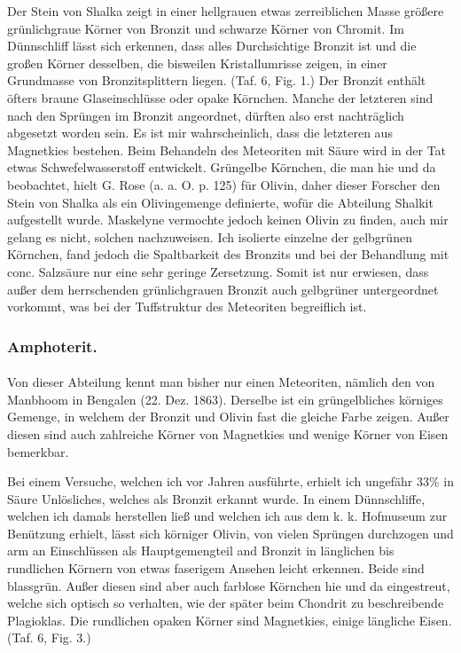 \documentclass[a4paper, 11pt, oneside, polutonikogreek, german]{article}
\begin{document}
Der Stein von Shalka zeigt in einer hellgrauen etwas zerreiblichen Masse größere grünlichgraue Körner von Bronzit und schwarze Körner von Chromit. Im Dünnschliff lässt sich erkennen, dass alles Durchsichtige Bronzit ist und die großen Körner desselben, die bisweilen Kristallumrisse zeigen, in einer Grundmasse von Bronzitsplittern liegen. (Taf. 6, Fig. 1.) Der Bronzit enthält öfters braune Glaseinschlüsse oder opake Körnchen. Manche der letzteren sind nach den Sprüngen im Bronzit angeordnet, dürften also erst nachträglich abgesetzt worden sein. Es ist mir wahrscheinlich, dass die letzteren aus Magnetkies bestehen. Beim Behandeln des Meteoriten mit Säure wird in der Tat etwas Schwefelwasserstoff entwickelt. Grüngelbe Körnchen, die man hie und da beobachtet, hielt G. Rose (a. a. O. p. 125) für Olivin, daher dieser Forscher den Stein von Shalka als ein Olivingemenge definierte, wofür die Abteilung Shalkit aufgestellt wurde. Maskelyne vermochte jedoch keinen Olivin zu finden, auch mir gelang es nicht, solchen nachzuweisen. Ich isolierte einzelne der gelbgrünen Körnchen, fand jedoch die Spaltbarkeit des Bronzits und bei der Behandlung mit conc. Salzsäure nur eine sehr geringe Zersetzung. Somit ist nur erwiesen, dass außer dem herrschenden grünlichgrauen Bronzit auch gelbgrüner untergeordnet vorkommt, was bei der Tuffstruktur des Meteoriten begreiflich ist.

\subsubsection{Amphoterit.}
\paragraph{}
Von dieser Abteilung kennt man bisher nur einen Meteoriten, nämlich den von Manbhoom in Bengalen (22. Dez. 1863). Derselbe ist ein grüngelbliches körniges Gemenge, in welchem der Bronzit und Olivin fast die gleiche Farbe zeigen. Außer diesen sind auch zahlreiche Körner von Magnetkies und wenige Körner von Eisen bemerkbar.

Bei einem Versuche, welchen ich vor Jahren ausführte, erhielt ich ungefähr 33\% in Säure Unlösliches, welches als Bronzit erkannt wurde. In einem Dünnschliffe, welchen ich damals herstellen ließ und welchen ich aus dem k. k. Hofmuseum zur Benützung erhielt, lässt sich körniger Olivin, von vielen Sprüngen durchzogen und arm an Einschlüssen als Hauptgemengteil and Bronzit in länglichen bis rundlichen Körnern von etwas faserigem Ansehen leicht erkennen. Beide sind blassgrün. Außer diesen sind aber auch farblose Körnchen hie und da eingestreut, welche sich optisch so verhalten, wie der später beim Chondrit zu beschreibende Plagioklas. Die rundlichen opaken Körner sind Magnetkies, einige längliche Eisen. (Taf. 6, Fig. 3.)
\end{document}
